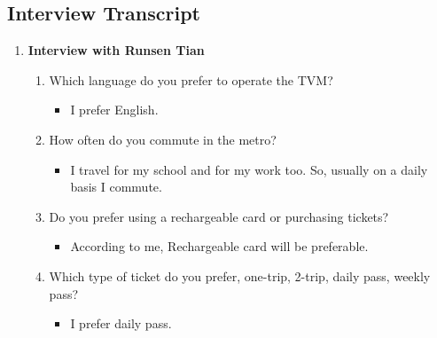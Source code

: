 \documentclass[15pt]{article}
\begin{document}
\begin{appendices}
\section*{Interview Transcript}

\begin{enumerate}[leftmargin=3em, itemsep=0pt, parsep=0pt, , font=\Large\bfseries]
    \item {\Large\bfseries Interview with Runsen Tian}
    \begin{enumerate}[leftmargin=2em, itemsep=0pt, parsep=0pt, , font=\Large\bfseries]
        \item {\Large Which language do you prefer to operate the TVM?}
        \vspace{0.1cm}
            \begin{itemize}
                \item {\Large I prefer English.}
            \end{itemize}
            \vspace{0.2cm}
        \item {\Large How often do you commute in the metro?}
        \vspace{0.1cm}
            \begin{itemize}
                \item {\Large I travel for my school and for my work too. So, usually on a daily basis I commute.}
            \end{itemize}
            \vspace{0.2cm}
        \item {\Large Do you prefer using a rechargeable card or purchasing tickets?}
        \vspace{0.1cm}
            \begin{itemize}
                \item {\Large  According to me, Rechargeable card will be preferable.}
            \end{itemize}
            \vspace{0.2cm}
        \item {\Large Which type of ticket do you prefer, one-trip, 2-trip, daily pass, weekly pass?}
        \vspace{0.1cm}
            \begin{itemize}
                \item {\Large I prefer daily pass.}
            \end{itemize}

\end{enumerate}
\end{enumerate}
\end{appendices}
\end{document}
